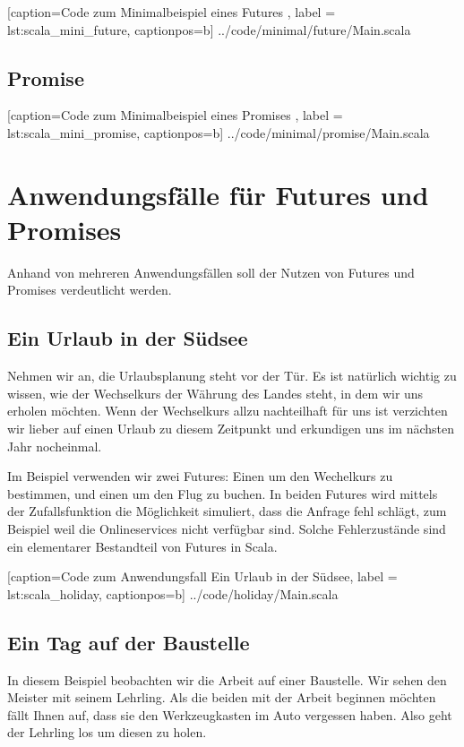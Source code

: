 \documentclass[11pt,a4paper,titlepage,ngerman]{scrartcl}
\begin{document}

    [caption={Code zum Minimalbeispiel eines Futures },
       label = lst:scala_mini_future,
       captionpos=b]
 {../code/minimal/future/Main.scala}

\subsection{Promise}


    [caption={Code zum Minimalbeispiel eines Promises },
       label = lst:scala_mini_promise,
       captionpos=b]
 {../code/minimal/promise/Main.scala}

\section{Anwendungsfälle für Futures und Promises}

Anhand von mehreren Anwendungsfällen soll der Nutzen von Futures und Promises
verdeutlicht werden. 

\subsection{Ein Urlaub in der Südsee}

Nehmen wir an, die Urlaubsplanung steht vor der Tür. Es ist natürlich wichtig
zu wissen, wie der Wechselkurs der Währung des Landes steht, in dem wir uns
erholen möchten. Wenn der Wechselkurs allzu nachteilhaft für uns ist
verzichten wir lieber auf einen Urlaub zu diesem Zeitpunkt und erkundigen
uns im nächsten Jahr nocheinmal.

Im Beispiel verwenden wir zwei Futures: Einen um den Wechelkurs zu bestimmen,
und einen um den Flug zu buchen. In beiden Futures wird mittels der Zufallsfunktion
die Möglichkeit simuliert, dass die Anfrage fehl schlägt, zum Beispiel weil
die Onlineservices nicht verfügbar sind. Solche Fehlerzustände sind ein elementarer
Bestandteil von Futures in Scala.


    [caption={Code zum Anwendungsfall \glqq Ein Urlaub in der Südsee\grqq },
       label = lst:scala_holiday,
       captionpos=b]
 {../code/holiday/Main.scala}
 

\subsection{Ein Tag auf der Baustelle}

In diesem Beispiel beobachten wir die Arbeit auf einer Baustelle. Wir sehen
den Meister mit seinem Lehrling. Als die beiden mit der Arbeit beginnen möchten
fällt Ihnen auf, dass sie den Werkzeugkasten im Auto vergessen haben. Also
geht der Lehrling los um diesen zu holen.
\end{document}
